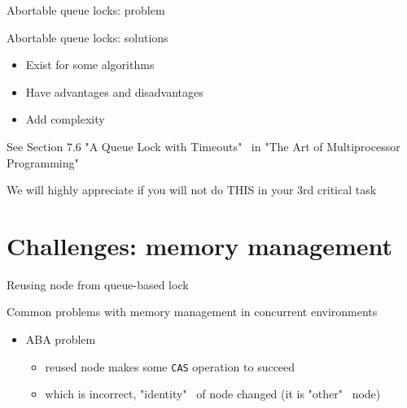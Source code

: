 \begin{frame}{Abortable queue locks: problem}

\end{frame}

\begin{frame}{Abortable queue locks: solutions}

\begin{itemize}
  \pause
  \item Exist \pause for some algorithms 
  \pause
  \item Have advantages and disadvantages
  \pause
  \item Add complexity
\end{itemize}

\pause
See Section 7.6 "A Queue Lock with Timeouts" \ in "The Art of Multiprocessor Programming" 

\pause
We will highly appreciate if you will not do THIS in your 3rd critical task

\end{frame}

\section{Challenges: memory management}
\showTOC

\begin{frame}[t]{Reusing node from queue-based lock}

Common problems with memory management in concurrent environments
\begin{itemize}
  \pause \item ABA problem  
  \begin{itemize}
    \pause \item reused node makes some \texttt{CAS} operation to succeed
    \pause \item which is incorrect, "identity" \ of node changed (it is "other" \ node)
  \end{itemize}  
\end{itemize}
\end{frame}

